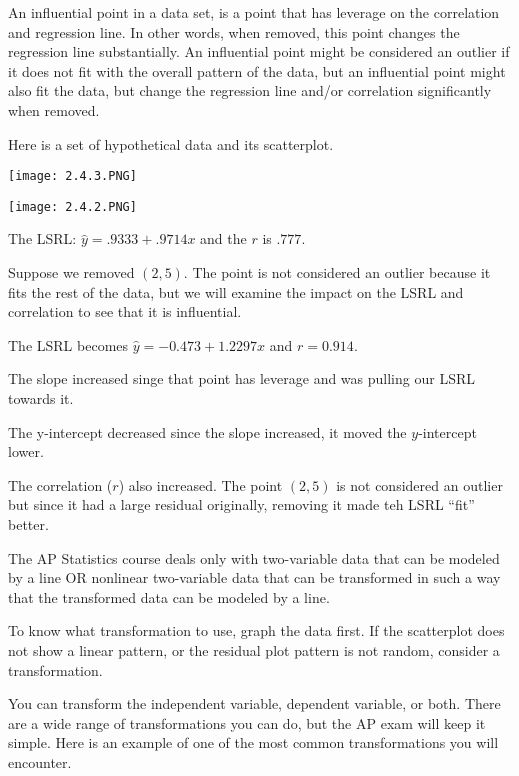 \documentclass[../stats.tex]{subfiles}
\begin{document}
An influential point in a data set, is a point that has leverage on the correlation and regression line. In other words, when removed, this point changes the regression line substantially. 
An influential point might be considered an outlier if it does not fit with the overall pattern of the data, but an influential point might also fit the data, but change the regression line and/or correlation significantly when removed.
\begin{example}
    Here is a set of hypothetical data and its scatterplot.
    \begin{center}
        \texttt{[image: 2.4.3.PNG]}
    \end{center}
    \begin{center}
        \texttt{[image: 2.4.2.PNG]}
    \end{center}

    The LSRL: $\hat{y}=.9333+.9714x$ and the $r$ is $.777$.

    Suppose we removed $(2,5)$. The point is not considered an outlier because it fits the rest of the data, but we will examine the impact on the LSRL and correlation to see that it is influential.

    The LSRL becomes $\hat{y}=-0.473+1.2297x$ and $r=0.914$.

    The slope increased singe that point has leverage and was pulling our LSRL towards it.

    The y-intercept decreased since the slope increased, it moved the $y$-intercept lower.

    The correlation ($r$) also increased. The point $(2,5)$ is not considered an outlier but since it had a large residual originally, removing it made teh LSRL ``fit'' better.
\end{example}

The AP Statistics course deals only with two-variable data that can be modeled by a line OR nonlinear two-variable data that can be transformed in such a way that the 
transformed data can be modeled by a line.

To know what transformation to use, graph the data first. If the scatterplot does not show a linear pattern, or the residual plot pattern is not random, consider a transformation.

You can transform the independent variable, dependent variable, or both. There are a wide range of transformations you can do, but the AP exam will keep it simple. Here is an example of one of the most common transformations you will encounter.
\end{document}
